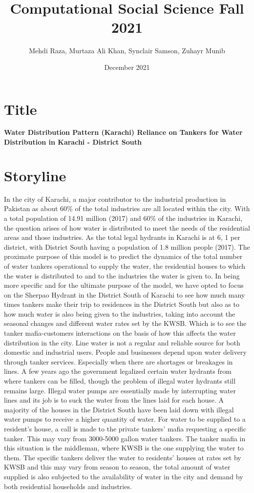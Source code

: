 \documentclass{article}
\title{Computational Social Science Fall 2021}
\author{Mehdi Raza, Murtaza Ali Khan, Synclair Samson, Zuhayr Munib}
\date{December 2021}
\begin{document}
\maketitle

\section*{Title}
\textbf{Water Distribution Pattern (Karachi)
Reliance on Tankers for Water Distribution in Karachi - District South}

\section*{Storyline}
In the city of Karachi, a major contributor to the industrial production in Pakistan as about 60\% of the total industries are all located within the city. With a total population of 14.91 million (2017) and 60\% of the industries in Karachi, the question arises of how water is distributed to meet the needs of the residential areas and those industries. As the total legal hydrants in Karachi is at 6, 1 per district, with District South having a population of 1.8 million people (2017). 
The proximate purpose of this model is to predict the dynamics of the total number of water tankers operational to supply the water, the residential houses to which the water is distributed to and to the industries the water is given to. In being more specific and for the ultimate purpose of the model, we have opted to focus on the Sherpao Hydrant in the District South of Karachi to see how much many times tankers make their trip to residences in the District South but also as to how much water is also being given to the industries, taking into account the seasonal changes and different water rates set by the KWSB. Which is to see the tanker mafia-customers interactions on the basis of how this affects the water distribution in the city.
Line water is not a regular and reliable source for both domestic and industrial users. People and businesses depend upon water delivery through tanker services. Especially when there are shortages or breakages in lines. A few years ago the government legalized certain water hydrants from where tankers can be filled, though the problem of illegal water hydrants still remains large. Illegal water pumps are essentially made by interrupting water lines and its job is to suck the water from the lines laid for each house. A majority of the houses in the District South have been laid down with illegal water pumps to receive a higher quantity of water. 
For water to be supplied to a resident’s house, a call is made to the private tankers’ mafia requesting a specific tanker. This may vary from 3000-5000 gallon water tankers. The tanker mafia in this situation is the middleman, where KWSB is the one supplying the water to them. The specific tankers deliver the water to residents’ houses at rates set by KWSB and this may vary from season to season, the total amount of water supplied is also subjected to the availability of water in the city and demand by both residential households and industries.
\end{document}
